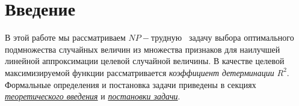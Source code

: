 \documentclass[preprint,12pt]{elsarticle}
\begin{document}


\section{Введение}
\label{S:1}

В этой работе мы рассматриваем $NP-$трудную~\cite{chen2008np} задачу выбора оптимального подмножества случайных величин из множества признаков для наилучшей линейной аппроксимации целевой случайной величины. В качестве целевой максимизируемой функции рассматривается \textit{коэффициент детерминации} $R^2$. Формальные определения и постановка задачи приведены в секциях \hyperref[sec:theory]{\textit{теоретического введения}} и \hyperref[S:2]{\textit{постановки задачи}}.
\end{document}
